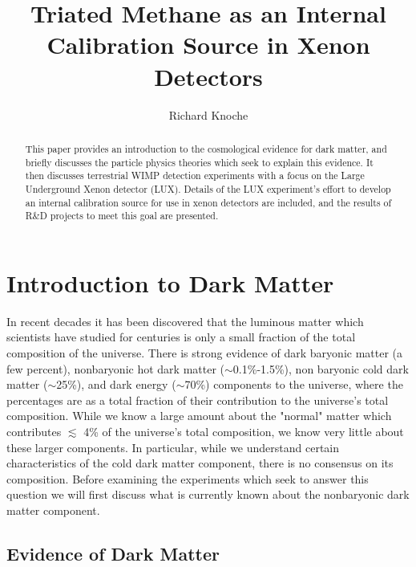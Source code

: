 \documentclass[a4paper,12pt]{article}
\begin{document}
\title{Triated Methane as an Internal Calibration Source in Xenon Detectors}
\author{Richard Knoche}
\maketitle

\begin{abstract}
This paper provides an introduction to the cosmological evidence for dark matter, and briefly discusses the particle physics theories which seek to explain this evidence.  It then discusses terrestrial WIMP detection experiments with a focus on the Large Underground Xenon detector (LUX).  Details of the LUX experiment's effort to develop an internal calibration source for use in xenon detectors are included, and the results of R\&D projects to meet this goal are presented.
\end{abstract}

\tableofcontents



\section{Introduction to Dark Matter}

In recent decades it has been discovered that the luminous matter which scientists have studied for centuries is only a small fraction of the total composition of the universe.  There is strong evidence of dark baryonic matter (a few percent), nonbaryonic hot dark matter ($\sim$0.1\%-1.5\%), non baryonic cold dark matter ($\sim$25\%), and dark energy ($\sim$70\%) components to the universe, where the percentages are as a total fraction of their contribution to the universe's total composition.  While we know a large amount about the "normal" matter which contributes $ \lesssim $ 4\% of the universe's total composition, we know very little about these larger components.  In particular, while we understand certain characteristics of the cold dark matter component, there is no consensus on its composition.  Before examining the experiments which seek to answer this question we will first discuss what is currently known about the nonbaryonic dark matter component.

\subsection{Evidence of Dark Matter}
\end{document}
